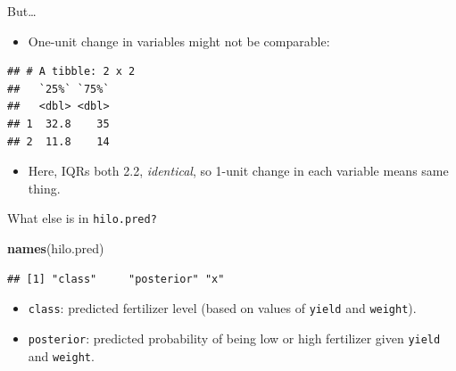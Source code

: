 \documentclass[
  ignorenonframetext,
]{beamer}
\newenvironment{Shaded}{\begin{snugshade}}{\end{snugshade}}
\newcommand{\FloatTok}[1]{\textcolor[rgb]{0.00,0.00,0.81}{#1}}
\newcommand{\KeywordTok}[1]{\textcolor[rgb]{0.13,0.29,0.53}{\textbf{#1}}}
\newcommand{\NormalTok}[1]{#1}
\newcommand{\OperatorTok}[1]{\textcolor[rgb]{0.81,0.36,0.00}{\textbf{#1}}}
\newcommand{\StringTok}[1]{\textcolor[rgb]{0.31,0.60,0.02}{#1}}
\providecommand{\tightlist}{%
  \setlength{\itemsep}{0pt}\setlength{\parskip}{0pt}}
\begin{document}
\begin{frame}[fragile]{But\ldots}
\protect\hypertarget{but-2}{}

\begin{itemize}
\tightlist
\item
  One-unit change in variables might not be comparable:
\end{itemize}

\begin{Shaded}
\end{Shaded}

\begin{verbatim}
## # A tibble: 2 x 2
##   `25%` `75%`
##   <dbl> <dbl>
## 1  32.8    35
## 2  11.8    14
\end{verbatim}

\begin{itemize}
\tightlist
\item
  Here, IQRs both 2.2, \emph{identical}, so 1-unit change in each
  variable means same thing.
\end{itemize}

\end{frame}

\begin{frame}[fragile]{What else is in \texttt{hilo.pred?}}
\protect\hypertarget{what-else-is-in-hilo.pred}{}

\small

\begin{Shaded}
\begin{Highlighting}[]
\KeywordTok{names}\NormalTok{(hilo.pred)}
\end{Highlighting}
\end{Shaded}

\begin{verbatim}
## [1] "class"     "posterior" "x"
\end{verbatim}

\normalsize

\begin{itemize}
\item
  \texttt{class}: predicted fertilizer level (based on values of
  \texttt{yield} and \texttt{weight}).
\item
  \texttt{posterior}: predicted probability of being low or high
  fertilizer given \texttt{yield} and \texttt{weight}.
\end{itemize}

\end{frame}
\end{document}
